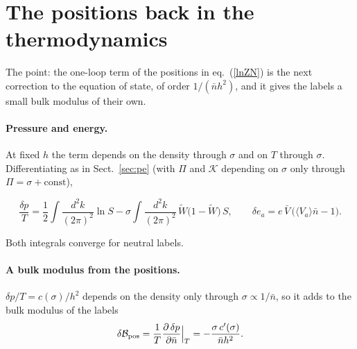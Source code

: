 \documentclass[11pt,aps,preprint,nofootinbib,superscriptaddress,tightenlines]{revtex4-2}
\newcommand{\avg}[1]{\langle #1\rangle}
\newcommand{\klab}{\mathcal B}
\def\st{\begin{equation}}
\def\stp{\end{equation}}
\def\Eq#1{eq.~(\ref{#1})}
\def\Sect#1{Sect.~\ref{#1}}
\let\oldparagraph\paragraph
\renewcommand{\paragraph}{\par\bigskip\oldparagraph}
\begin{document}
\section{The positions back in the thermodynamics}
\label{sec:back}

The point: the one-loop term of the positions in \Eq{lnZN} is the next correction to the equation of state, of order $1/(\bar nh^2)$, and it gives the labels a small
bulk modulus of their own.

\paragraph{Pressure and energy.}  At fixed $h$ the term depends on the density through $\sigma$ and on $T$ through $\sigma$.  Differentiating as in \Sect{sec:pe}
(with $\Pi$ and $\mathcal K$ depending on $\sigma$ only through $\Pi=\sigma+\text{const}$),
\begin{keyeq}
\st
\frac{\delta p}T=\frac12\int\frac{d^2k}{(2\pi)^2}\ln S-\sigma\int\frac{d^2k}{(2\pi)^2}\,\widetilde W\big(1-\widetilde W\big)\,S,\qquad
\delta e_a=e\,\bar V\,\big(\avg{V_a}\bar n-1\big) .
\label{labelloop}
\stp
\end{keyeq}
Both integrals converge for neutral labels.

\paragraph{A bulk modulus from the positions.}  $\delta p/T=c(\sigma)/h^2$ depends on the density only through $\sigma\propto1/\bar n$, so it adds to the bulk modulus of the labels
\st
\delta\klab_{\rm pos}=\frac1T\frac{\partial\,\delta p}{\partial\bar n}\Big|_T=-\frac{\sigma\,c'(\sigma)}{\bar nh^2} .
\label{dklab}
\stp
\end{document}
